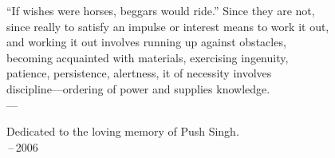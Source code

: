 \thispagestyle{empty}
{}

\vspace*{3cm}

\begin{center}
``If wishes were horses, beggars would ride.''  Since they are not, \\ \medskip
since really to satisfy an impulse or interest means to work it out, \\ \medskip
and working it out involves running up against obstacles, \\ \medskip
becoming acquainted with materials, exercising ingenuity, \\ \medskip
patience, persistence, alertness, it of necessity involves \\ \medskip
discipline---ordering of power and supplies knowledge. \\ \medskip
    ---  \citep{dewey:1907}
\end{center}

\medskip

\begin{center}
    Dedicated to the loving memory of Push Singh. \\ \,--\,2006
\end{center}
